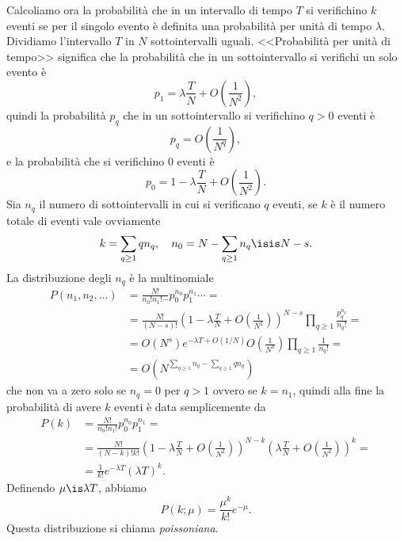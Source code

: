 Calcoliamo ora la probabilità che in un intervallo di tempo $T$ si verifichino $k$ eventi se per il singolo evento è definita una probabilità per unità di tempo $\lambda$.
Dividiamo l'intervallo $T$ in $N$ sottointervalli uguali.
<<Probabilità per unità di tempo>> significa che
la probabilità che in un sottointervallo si verifichi un solo evento è
\begin{equation*}
	p_1 = \lambda \frac TN + O\left(\frac1{N^2}\right),
\end{equation*}
quindi la probabilità $p_q$ che in un sottointervallo si verifichino $q>0$ eventi è
\begin{equation*}
	p_q = O\left(\frac1{N^q}\right),
\end{equation*}
e la probabilità che si verifichino 0 eventi è
\begin{equation*}
	p_0 = 1 - \lambda \frac TN + O\left(\frac1{N^2}\right).
\end{equation*}
Sia $n_q$ il numero di sottointervalli in cui si verificano $q$ eventi,
se $k$ è il numero totale di eventi vale ovviamente
\begin{equation*}
	k = \sum_{q\ge1} q n_q, \quad n_0 = N - \sum_{q\ge 1} n_q \isis N - s.
\end{equation*}
La distribuzione degli $n_q$ è la multinomiale
\begin{align*}
	P(n_1,n_2,\dotsc)
	&= \frac{N!}{n_0!n_1!\dotsm} p_0^{n_0} p_1^{n_1} \dotsm = \\
	&= \frac{N!}{(N - s)!}
	\left(1 - \lambda \frac TN + O\left(\frac1{N^2}\right)\right)^{N-s}
	\prod_{q\ge1} \frac{p_q^{n_q}}{n_q!} = \\
	&= O(N^s) e^{-\lambda T + O(1/N)}
	O\left(\frac1{N^k}\right) \prod_{q\ge1} \frac1{n_q!} = \\
	&= O\left(N^{\sum_{q\ge1} n_q - \sum_{q\ge1} qn_q}\right)
\end{align*}
che non va a zero solo se $n_q=0$ per $q > 1$ ovvero se $k=n_1$,
quindi alla fine la probabilità di avere $k$ eventi è data semplicemente da
\begin{align*}
	P(k)
	&= \frac{N!}{n_0!n_1!}p_0^{n_0}p_1^{n_1} = \\
	&= \frac{N!}{(N-k)!k!}
	\left(1 - \lambda \frac TN + O\left(\frac1{N^2}\right)\right)^{N-k}
	\left(\lambda \frac TN + O\left(\frac1{N^2}\right)\right)^k = \\
	&= \frac1{k!}e^{-\lambda T}(\lambda T)^k.
\end{align*}
Definendo $\mu\is\lambda T$, abbiamo
\begin{equation*}
	P(k;\mu) = \frac{\mu^k}{k!} e^{-\mu}.
\end{equation*}
Questa distribuzione si chiama \emph{poissoniana}.


